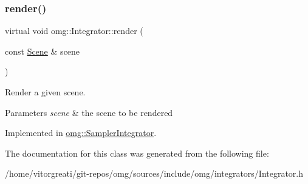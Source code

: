 \mbox{\label{classomg_1_1_integrator_a9353c1a5abd1396d7c1fcd4f3e250998}} 
\subsubsection{\texorpdfstring{render()}{render()}}
{\footnotesize\ttfamily virtual void omg\+::\+Integrator\+::render (\begin{DoxyParamCaption}\item[{const \mbox{\hyperlink{classomg_1_1_scene}{Scene}} \&}]{scene }\end{DoxyParamCaption})\hspace{0.3cm}{\ttfamily [pure virtual]}}



Render a given scene. 


\begin{DoxyParams}{Parameters}
{\em scene} & the scene to be rendered \\
\hline
\end{DoxyParams}


Implemented in \mbox{\hyperlink{classomg_1_1_sampler_integrator_a4b147659d3227e8dd8a38e7518ab5d72}{omg\+::\+Sampler\+Integrator}}.



The documentation for this class was generated from the following file\+:\begin{DoxyCompactItemize}
\item 
/home/vitorgreati/git-\/repos/omg/sources/include/omg/integrators/Integrator.\+h\end{DoxyCompactItemize}
